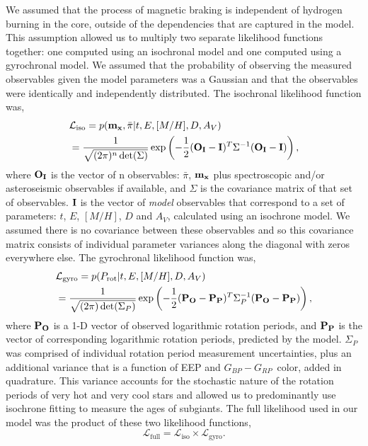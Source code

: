 \documentclass[useAMS, usenatbib, preprint, 12pt]{aastex}
\newcommand{\pmega}{$\bar{\pi}$}
\newcommand{\gcolor}{$G_{BP} - G_{RP}$}
\begin{document}
We assumed that the process of magnetic braking is independent of hydrogen
burning in the core, outside of the dependencies that are captured in the
model.
This assumption allowed us to multiply two separate likelihood
functions together: one computed using an isochronal model and one computed
using a gyrochronal model.
We assumed that the probability of observing the measured observables given
the model parameters was a Gaussian and that the observables were identically
and independently distributed.
The isochronal likelihood function was,
\begin{eqnarray} \label{eqn:isochrones_only_likelihood}
    & \mathcal{L_{\mathrm{iso}}} = p({\bf m_x},
    \bar{\pi}|t, E, [M/H], D,
    A_V) \\ \nonumber
    & = \frac{1}{\sqrt{(2\pi)^n \det(\Sigma)}}
    \exp\left( -\frac{1}{2} ({\bf O_I} - {\bf I})^T \Sigma ^{-1}
    ({\bf O_I} - {\bf I})\right),
\end{eqnarray}
where ${\bf O_I}$ is the vector of n observables: \pmega, ${\bf m_x}$ plus
spectroscopic and/or asteroseismic observables if available, and $\Sigma$ is
the covariance matrix of that set of observables.
${\bf I}$ is the vector of {\it model} observables that correspond to a set of
parameters: $t$, $E$, $[M/H]$, $D$ and $A_V$, calculated using an isochrone model.
We assumed there is no covariance between these observables and so this
covariance matrix consists of individual parameter variances along the
diagonal with zeros everywhere else.
The gyrochronal likelihood function was,
\begin{eqnarray} \label{eqn:gyro_likelihood}
    & \mathcal{L_{\mathrm{gyro}}} = p(P_\mathrm{rot} |t, E, [M/H], D, A_V) \\ \nonumber
    & = \frac{1}{\sqrt{(2\pi) \det(\Sigma_P)}}
    \exp\left( -\frac{1}{2} ({\bf P_O} - {\bf P_P})^T \Sigma_P ^{-1}
    ({\bf P_O} - {\bf P_P})\right),
\end{eqnarray}
where ${\bf P_O}$ is a 1-D vector of observed logarithmic rotation periods,
and ${\bf P_P}$ is the vector of corresponding logarithmic rotation periods,
predicted by the model.
$\Sigma_P$ was comprised of individual rotation period measurement
uncertainties, plus an additional variance that is a function of EEP and
\gcolor\
color, added in quadrature.
This variance accounts for the stochastic nature of the rotation periods of
very hot and very cool stars and allowed us to predominantly use isochrone
fitting to measure the ages of subgiants.
The full likelihood used in our model was the product of these two likelihood
functions,
\begin{equation}
    \mathcal{L}_{\mathrm{full}} = \mathcal{L}_{\mathrm{iso}} \times
    \mathcal{L}_{\mathrm{gyro}}.
\end{equation}
\end{document}
